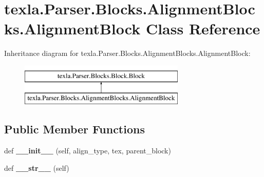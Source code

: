\hypertarget{classtexla_1_1Parser_1_1Blocks_1_1AlignmentBlocks_1_1AlignmentBlock}{}\section{texla.\+Parser.\+Blocks.\+Alignment\+Blocks.\+Alignment\+Block Class Reference}
\label{classtexla_1_1Parser_1_1Blocks_1_1AlignmentBlocks_1_1AlignmentBlock}
Inheritance diagram for texla.\+Parser.\+Blocks.\+Alignment\+Blocks.\+Alignment\+Block\+:\begin{figure}[H]
\begin{center}
\leavevmode
\includegraphics[height=2.000000cm]{classtexla_1_1Parser_1_1Blocks_1_1AlignmentBlocks_1_1AlignmentBlock}
\end{center}
\end{figure}
\subsection*{Public Member Functions}
\begin{DoxyCompactItemize}
\item 
\hypertarget{classtexla_1_1Parser_1_1Blocks_1_1AlignmentBlocks_1_1AlignmentBlock_a10f5e4db0a946b1ae6abe1f5285a12ac}{}\label{classtexla_1_1Parser_1_1Blocks_1_1AlignmentBlocks_1_1AlignmentBlock_a10f5e4db0a946b1ae6abe1f5285a12ac} 
def {\bfseries \+\_\+\+\_\+init\+\_\+\+\_\+} (self, align\+\_\+type, tex, parent\+\_\+block)
\item 
\hypertarget{classtexla_1_1Parser_1_1Blocks_1_1AlignmentBlocks_1_1AlignmentBlock_a5bde355ba093770bfdc68287d4b35ac2}{}\label{classtexla_1_1Parser_1_1Blocks_1_1AlignmentBlocks_1_1AlignmentBlock_a5bde355ba093770bfdc68287d4b35ac2} 
def {\bfseries \+\_\+\+\_\+str\+\_\+\+\_\+} (self)
\end{DoxyCompactItemize}
